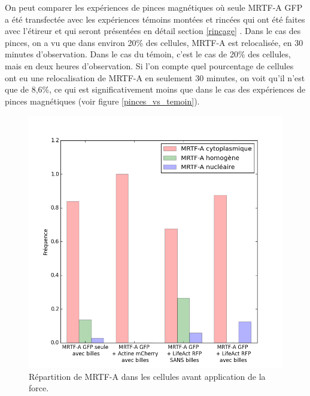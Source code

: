 On peut comparer les expériences de pinces magnétiques où seule MRTF-A GFP a été transfectée avec les expériences témoins montées et rincées qui ont été faites avec l'étireur et qui seront présentées en détail section \ref{rinçage} . Dans le cas des pinces, on a vu que dans environ 20\% des cellules, MRTF-A est relocalisée, en 30 minutes d'observation. Dans le cas du témoin, c'est le cas de 20\% des cellules, mais en deux heures d'observation. Si l'on compte quel pourcentage de cellules ont eu une relocalisation de MRTF-A en seulement 30 minutes, on voit qu'il n'est que de 8,6\%, ce qui est significativement moins que dans le cas des expériences de pinces magnétiques (voir figure \ref{pinces_vs_temoin}).






\begin{figure}
\includegraphics[scale=0.4]{Figures/CHN_pinces.png} 
\caption{Répartition de MRTF-A dans les cellules avant application de la force. \label{CHN_pinces}}
\end{figure}

